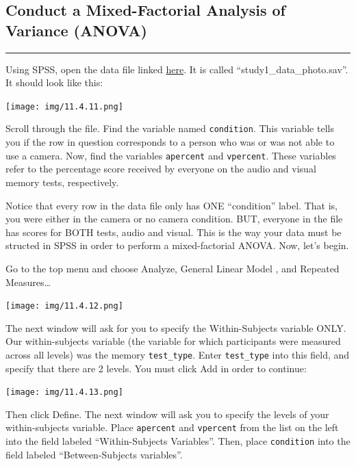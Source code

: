 \documentclass[
]{book}
\begin{document}
\hypertarget{conduct-a-mixed-factorial-analysis-of-variance-anova}{%
\subsection{Conduct a Mixed-Factorial Analysis of Variance (ANOVA)}\label{conduct-a-mixed-factorial-analysis-of-variance-anova}}

\begin{center}\rule{0.5\linewidth}{0.5pt}\end{center}

Using SPSS, open the data file linked \href{https://github.com/CrumpLab/statisticsLab/blob/master/data/spssdata/study1_data_photo.sav}{here}. It is called ``study1\_data\_photo.sav''. It should look like this:

\texttt{[image: img/11.4.11.png]}

Scroll through the file. Find the variable named \texttt{condition}. This variable tells you if the row in question corresponds to a person who was or was not able to use a camera. Now, find the variables \texttt{apercent} and \texttt{vpercent}. These variables refer to the percentage score received by everyone on the audio and visual memory tests, respectively.

Notice that every row in the data file only has ONE ``condition'' label. That is, you were either in the camera or no camera condition. BUT, everyone in the file has scores for BOTH tests, audio and visual. This is the way your data must be structed in SPSS in order to perform a mixed-factorial ANOVA. Now, let's begin.

Go to the top menu and choose {Analyze}, {General Linear Model }, and {Repeated Measures\ldots{}}

\texttt{[image: img/11.4.12.png]}

The next window will ask for you to specify the Within-Subjects variable ONLY. Our within-subjects variable (the variable for which participants were measured across all levels) was the memory \texttt{test\_type}. Enter \texttt{test\_type} into this field, and specify that there are 2 levels. You must click {Add} in order to continue:

\texttt{[image: img/11.4.13.png]}

Then click {Define}. The next window will ask you to specify the levels of your within-subjects variable. Place \texttt{apercent} and \texttt{vpercent} from the list on the left into the field labeled ``Within-Subjects Variables''. Then, place \texttt{condition} into the field labeled ``Between-Subjects variables''.
\end{document}
